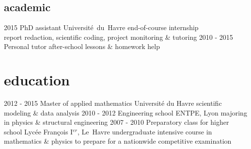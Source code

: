 \documentclass[a4paper]{farangoth-cv}
\begin{document}
\subsection{academic}
\begin{entrylist}
  \entry%
  {2015}
  {PhD assistant}
  {\mbox{Université du Havre}}
  {%
    end-of-course internship\\
    report redaction, scientific coding, project monitoring \& tutoring
  }
  \entry%
  {2010 \-- 2015}
  {Personal tutor}
  {}
  {%
    after-school lessons \& homework help
  }
\end{entrylist}

  

\section{education}
\begin{entrylist}
  \entry%
  {2012 \-- 2015}
  {Master of applied mathematics}
  {Université du Havre}
  {%
    scientific modeling \& data analysis
  }
  \entry%
  {2010 \-- 2012}
  {Engineering school}
  {ENTPE, Lyon}
  {%
    majoring in physics \& structural engineering
  }
  \entry%
  {2007 \-- 2010}
  {Preparatory class for higher school}
  {Lycée François I$^{er}$, \mbox{Le Havre}}
  {%
    undergraduate intensive course in mathematics \& physics to prepare for a nationwide competitive examination
  }
\end{entrylist}

\makefooter{}
\end{document}
